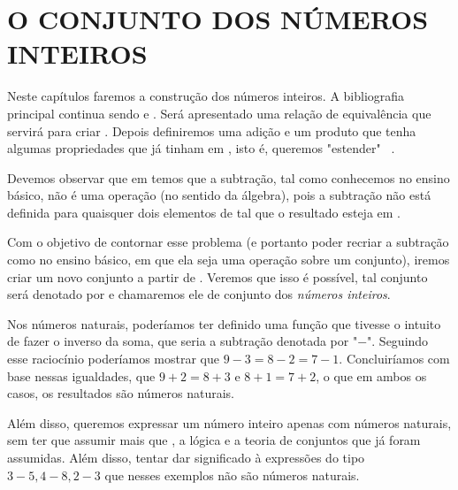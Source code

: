 \documentclass[../main.tex]{subfiles}
\begin{document}
\chapter{O CONJUNTO DOS NÚMEROS INTEIROS}
Neste capítulos faremos a construção dos números inteiros. A bibliografia principal continua sendo \Parencite{ferreira} e \Parencite{domingues-2009}. Será apresentado uma relação de equivalência que servirá para criar \Z. Depois definiremos uma adição e um produto que tenha algumas propriedades que já tinham em \N, isto é, queremos "estender" \ \N.

Devemos observar que em \N temos que a subtração, tal como conhecemos no ensino básico, não é uma operação (no sentido da álgebra), pois a subtração não está definida para quaisquer dois elementos de \N tal que o resultado esteja em \N.

Com o objetivo de contornar esse problema (e portanto poder recriar a subtração como no ensino básico, em que ela seja uma operação sobre um conjunto), iremos criar um novo conjunto a partir de \N. Veremos que isso é possível, tal conjunto será denotado por \Z e chamaremos ele de conjunto dos \emph{números inteiros}.

Nos números naturais, poderíamos ter definido uma função que tivesse o intuito de fazer o inverso da soma, que seria a subtração denotada por "$-$". Seguindo esse raciocínio poderíamos mostrar que $9-3 = 8-2 = 7-1$. Concluiríamos com base nessas igualdades, que $9 + 2 = 8 + 3$ e $8 + 1 = 7 + 2$, o que em ambos os casos, os resultados são números naturais. 

Além disso, queremos expressar um número inteiro apenas com números naturais, sem ter que assumir mais que \N, a lógica e a teoria de conjuntos que já foram assumidas. Além disso, tentar dar significado à expressões do tipo $3-5, 4-8, 2-3$ que nesses exemplos não são números naturais.
\end{document}
